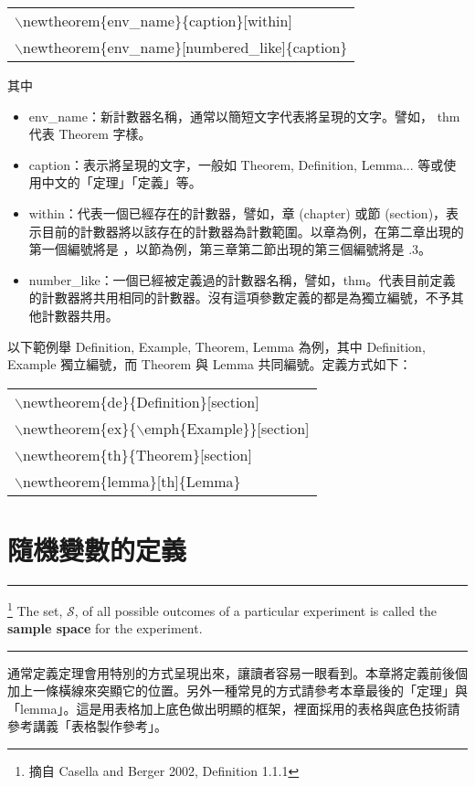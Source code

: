  \begin{center}{\begin{tabular}{l}
 {\C  $\backslash$newtheorem\{env\_name\}\{caption\}[within]}\\
 {\C $\backslash$newtheorem\{env\_name\}[numbered\_like]\{caption\}}\\
 \end{tabular}}\end{center}
其中
\begin{itemize}
\item {\C env\_name}：新計數器名稱，通常以簡短文字代表將呈現的文字。譬如， {\C thm} 代表 {\C Theorem} 字樣。
\item {\C caption}：表示將呈現的文字，一般如 {\C Theorem, Definition, Lemma...} 等或使用中文的「定理」「定義」等。
\item {\C within}：代表一個已經存在的計數器，譬如，章 ({\C chapter}) 或節 ({\C section})，表示目前的計數器將以該存在的計數器為計數範圍。以章為例，在第二章出現的第一個編號將是 {}，以節為例，第三章第二節出現的第三個編號將是 {.3}。
\item {\C number\_like}：一個已經被定義過的計數器名稱，譬如，{\C thm}。代表目前定義的計數器將共用相同的計數器。沒有這項參數定義的都是為獨立編號，不予其他計數器共用。
\end{itemize}
以下範例舉 {\C Definition, Example, Theorem, Lemma} 為例，其中 {\C Definition, Example} 獨立編號，而 {\C Theorem} 與 {\C Lemma} 共同編號。定義方式如下：

 \begin{center}{\begin{tabular}{l}
 {\C $\backslash$newtheorem\{de\}\{Definition\}[section]}\\
 {\C  $\backslash$newtheorem\{ex\}\{$\backslash$emph\{Example\}\}[section]}\\
 {\C $\backslash$newtheorem\{th\}\{Theorem\}[section]}\\
 {\C $\backslash$newtheorem\{lemma\}[th]\{Lemma\}}\\
\end{tabular}}\end{center}


\section{{\MB 隨機變數的定義}}
 \rule{\textwidth}{0.2pt}
 \begin{de}\footnote{摘自 {\C Casella and Berger 2002, Definition 1.1.1}}  %
{\C The set, $\mathcal{S}$, of all possible outcomes of a particular experiment is called the \textbf{sample space} for the experiment.}\\
 \rule{\textwidth}{0.2pt}
\end{de}
\noindent 通常定義定理會用特別的方式呈現出來，讓讀者容易一眼看到。本章將定義前後個加上一條橫線來突顯它的位置。另外一種常見的方式請參考本章最後的「定理」與「{\E lemma}」。這是用表格加上底色做出明顯的框架，裡面採用的表格與底色技術請參考講義「表格製作參考」。

